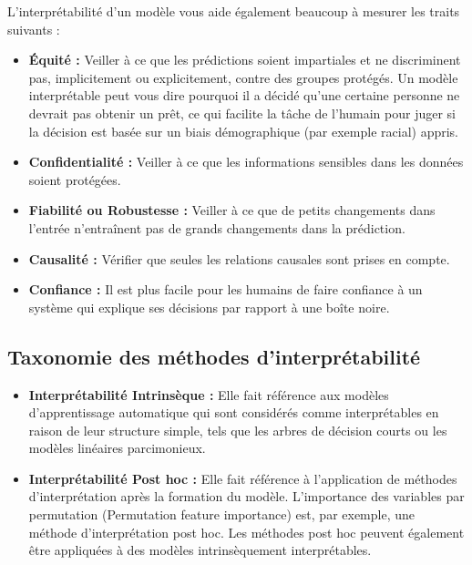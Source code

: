 L'interprétabilité d'un modèle vous aide également beaucoup à mesurer les traits suivants :
\begin{itemize}

    \item
    \textbf{Équité :} Veiller à ce que les prédictions soient impartiales et ne discriminent pas, implicitement ou explicitement, contre des groupes protégés. Un modèle interprétable peut vous dire pourquoi il a décidé qu'une certaine personne ne devrait pas obtenir un prêt, ce qui facilite la tâche de l'humain pour juger si la décision est basée sur un biais démographique (par exemple racial) appris.

    \item
    \textbf{Confidentialité :} Veiller à ce que les informations sensibles dans les données soient protégées.

    \item
    \textbf{Fiabilité ou Robustesse :} Veiller à ce que de petits changements dans l'entrée n'entraînent pas de grands changements dans la prédiction.

    \item
    \textbf{Causalité :} Vérifier que seules les relations causales sont prises en compte.

    \item
    \textbf{Confiance :} Il est plus facile pour les humains de faire confiance à un système qui explique ses décisions par rapport à une boîte noire.

\end{itemize}

\subsection{Taxonomie des méthodes d'interprétabilité}

\begin{itemize}
    \item
    \textbf{Interprétabilité Intrinsèque :} Elle fait référence aux modèles d'apprentissage automatique qui sont considérés comme interprétables en raison de leur structure simple, tels que les arbres de décision courts ou les modèles linéaires parcimonieux. 

    \item
    \textbf{Interprétabilité Post hoc :} Elle fait référence à l'application de méthodes d'interprétation après la formation du modèle. L'importance des variables par permutation (Permutation feature importance) est, par exemple, une méthode d'interprétation post hoc. Les méthodes post hoc peuvent également être appliquées à des modèles intrinsèquement interprétables.
\end{itemize}

